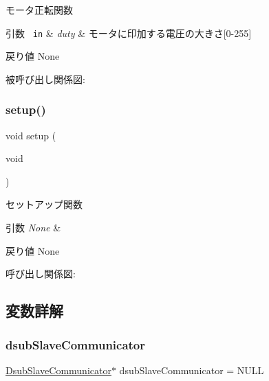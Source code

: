 モータ正転関数 


\begin{DoxyParams}[1]{引数}
\mbox{\texttt{ in}}  & {\em duty} & モータに印加する電圧の大きさ\mbox{[}0-\/255\mbox{]} \\
\hline
\end{DoxyParams}
\begin{DoxyReturn}{戻り値}
None 
\end{DoxyReturn}
被呼び出し関係図\+:
\mbox{\label{iraira__bo__up__down__mod_8ino_a7dfd9b79bc5a37d7df40207afbc5431f}} 
\subsubsection{\texorpdfstring{setup()}{setup()}}
{\footnotesize\ttfamily void setup (\begin{DoxyParamCaption}\item[{void}]{ }\end{DoxyParamCaption})}



セットアップ関数 


\begin{DoxyParams}{引数}
{\em None} & \\
\hline
\end{DoxyParams}
\begin{DoxyReturn}{戻り値}
None 
\end{DoxyReturn}
呼び出し関係図\+:


\subsection{変数詳解}
\mbox{\label{iraira__bo__up__down__mod_8ino_adb2253a9db904473e0b317580548c627}} 
\subsubsection{\texorpdfstring{dsubSlaveCommunicator}{dsubSlaveCommunicator}}
{\footnotesize\ttfamily \mbox{\hyperlink{class_dsub_slave_communicator}{Dsub\+Slave\+Communicator}}$\ast$ dsub\+Slave\+Communicator = N\+U\+LL}

